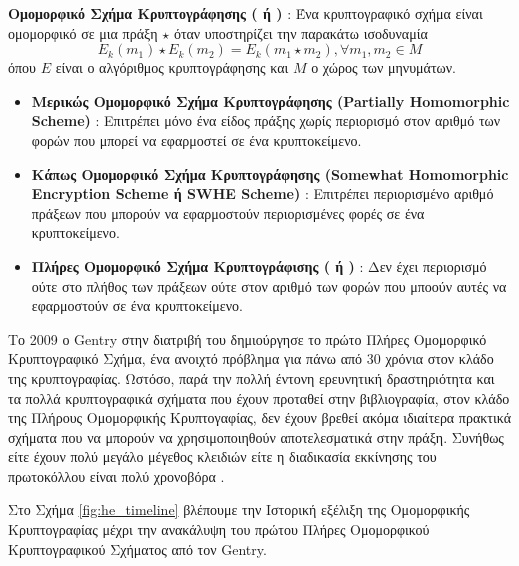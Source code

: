 \begin{definition}
\textbf{Ομομορφικό Σχήμα Κρυπτογράφησης ( ή )} : Ένα κρυπτογραφικό σχήμα είναι ομομορφικό σε μια πράξη $\star$ όταν υποστηρίζει την παρακάτω ισοδυναμία
\begin{equation}
E_k(m_1) \star E_k(m_2) = E_k(m_1 \star m_2), \forall m_1, m_2 \in M
\end{equation}
όπου $E$ είναι ο αλγόριθμος κρυπτογράφησης και $M$ ο χώρος των μηνυμάτων.
\end{definition}

\begin{definition}
\begin{itemize}[leftmargin=*]
\textbf{Κύριες Κατηγορίες Ομομορφικής Κρυπτογράφησης} :
\item \textbf{Μερικώς Ομομορφικό Σχήμα Κρυπτογράφησης (Partially Homomorphic Scheme)} : Επιτρέπει μόνο ένα είδος πράξης χωρίς περιορισμό στον αριθμό των φορών που μπορεί να εφαρμοστεί σε ένα κρυπτοκείμενο.
\item \textbf{Κάπως Ομομορφικό Σχήμα Κρυπτογράφησης (Somewhat Homomorphic Encryption Scheme ή SWHE Scheme)} : Επιτρέπει περιορισμένο αριθμό πράξεων που μπορούν να εφαρμοστούν περιορισμένες φορές σε ένα κρυπτοκείμενο.
\item \textbf{Πλήρες Ομομορφικό Σχήμα Κρυπτογράφισης ( ή )} : Δεν έχει περιορισμό ούτε στο πλήθος των πράξεων ούτε στον αριθμό των φορών που μποούν αυτές να εφαρμοστούν σε ένα κρυπτοκείμενο.
\end{itemize}
\end{definition}

Το 2009 ο Gentry στην διατριβή του \cite{10.1145/1536414.1536440} δημιούργησε το πρώτο Πλήρες Ομομορφικό Κρυπτογραφικό Σχήμα, ένα ανοιχτό πρόβλημα για πάνω από 30 χρόνια στον κλάδο της κρυπτογραφίας. Ωστόσο, παρά την πολλή έντονη ερευνητική δραστηριότητα και τα πολλά κρυπτογραφικά σχήματα που έχουν προταθεί στην βιβλιογραφία, στον κλάδο της Πλήρους Ομομορφικής Κρυπτογαφίας, δεν έχουν βρεθεί ακόμα ιδιαίτερα πρακτικά σχήματα που να μπορούν να χρησιμοποιηθούν αποτελεσματικά στην πράξη. Συνήθως είτε έχουν πολύ μεγάλο μέγεθος κλειδιών είτε η διαδικασία εκκίνησης του πρωτοκόλλου είναι πολύ χρονοβόρα \cite{10.1007/978-3-642-20465-4_9}.

Στο Σχήμα \ref{fig:he_timeline} βλέπουμε την Ιστορική εξέλιξη της Ομομορφικής Κρυπτογραφίας μέχρι την ανακάλυψη του πρώτου Πλήρες Ομομορφικού Κρυπτογραφικού Σχήματος από τον Gentry.

